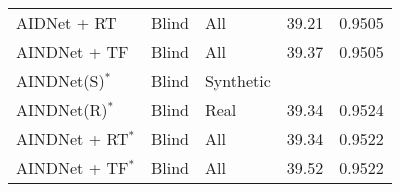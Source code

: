 \documentclass[10pt,twocolumn,letterpaper]{article}
\begin{document}
\begin{table}[t]
\begin{adjustbox}{width=0.94\linewidth}
\begin{tabular}{lllll}
			AIDNet + RT			& Blind 	 & All  & 39.21  	  & 0.9505		\\
			AINDNet + TF 		& Blind 	 & All  & 39.37  	  & 0.9505 		\\
			\midrule
			AINDNet(S)$^*$ 	    	 & Blind 	 & Synthetic  & \color{red}{39.77}  	  & \color{red}{0.9590} \\
			AINDNet(R)$^*$     	 & Blind 	 & Real  & 39.34  	  & 0.9524 \\
			AINDNet + RT$^*$ 			 & Blind 	 & All  & 39.34  	  & 0.9522 \\
			AINDNet + TF$^*$ 	    	 & Blind 	 & All  & 39.52  	  & 0.9522 \\
			\bottomrule					
		\end{tabular}
	\end{adjustbox}
\end{table}
\end{document}
